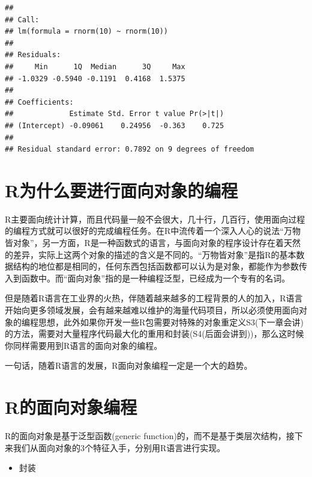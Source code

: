 \documentclass[]{book}
\providecommand{\tightlist}{%
  \setlength{\itemsep}{0pt}\setlength{\parskip}{0pt}}
\begin{document}
\begin{verbatim}
## 
## Call:
## lm(formula = rnorm(10) ~ rnorm(10))
## 
## Residuals:
##     Min      1Q  Median      3Q     Max 
## -1.0329 -0.5940 -0.1191  0.4168  1.5375 
## 
## Coefficients:
##             Estimate Std. Error t value Pr(>|t|)
## (Intercept) -0.09061    0.24956  -0.363    0.725
## 
## Residual standard error: 0.7892 on 9 degrees of freedom
\end{verbatim}

\section{R为什么要进行面向对象的编程}\label{r}

R主要面向统计计算，而且代码量一般不会很大，几十行，几百行，使用面向过程的编程方式就可以很好的完成编程任务。在R中流传着一个深入人心的说法``万物皆对象''，另一方面，R是一种函数式的语言，与面向对象的程序设计存在着天然的差异，实际上这两个对象的描述的含义是不同的。``万物皆对象''是指R的基本数据结构的地位都是相同的，任何东西包括函数都可以认为是对象，都能作为参数传入到函数中。而``面向对象''指的是一种编程泛型，已经成为一个专有的名词。

但是随着R语言在工业界的火热，伴随着越来越多的工程背景的人的加入，R语言开始向更多领域发展，会有越来越难以维护的海量代码项目，所以必须使用面向对象的编程思想，此外如果你开发一些R包需要对特殊的对象重定义S3(下一章会讲)的方法，需要对大量程序代码最大化的重用和封装(S4(后面会讲到))，那么这时候你同样需要用到R语言的面向对象的编程。

一句话，随着R语言的发展，R面向对象编程一定是一个大的趋势。

\section{R的面向对象编程}\label{r}

R的面向对象是基于泛型函数(generic
function)的，而不是基于类层次结构，接下来我们从面向对象的3个特征入手，分别用R语言进行实现。

\begin{itemize}
\tightlist
\item
  封装
\end{itemize}
\end{document}
